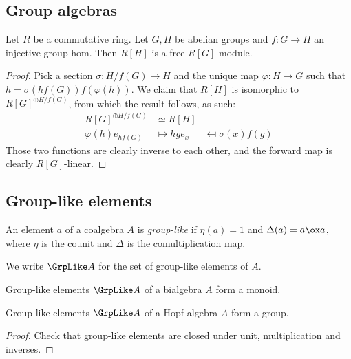 \subsection{Group algebras}


\begin{proposition}
  \label{0-grp-alg-free}
  \uses{}

  Let $R$ be a commutative ring.
  Let $G, H$ be abelian groups and $f : G \to H$ an injective group hom.
  Then $R[H]$ is a free $R[G]$-module.
\end{proposition}
\begin{proof}
  \uses{}

  Pick a section $\sigma : H / f(G) \to H$ and the unique map $\varphi : H \to G$
  such that $h = \sigma(h f(G)) f(\varphi(h))$.
  We claim that $R[H]$ is isomorphic to $R[G]^{\oplus H / f(G)}$, from which the result follows,
  as such:
  \begin{align*}
    R[G]^{\oplus H / f(G)} & \simeq R[H] \\
    \varphi(h) e_{h f(G)} & \mapsto h
    g e_x & \mapsfrom \sigma(x) f(g)
  \end{align*}
  Those two functions are clearly inverse to each other,
  and the forward map is clearly $R[G]$-linear.
\end{proof}

\subsection{Group-like elements}


\begin{definition}
  \label{0-grp-like}
  \uses{}
  \leanok

  An element $a$ of a coalgebra $A$ is \emph{group-like} if $\eta(a) = 1$ and $\Delta(a) = a \ox a$,
  where $\eta$ is the counit and $\Delta$ is the comultiplication map.

  We write $\GrpLike A$ for the set of group-like elements of $A$.
\end{definition}


\begin{proposition}
  \label{0-grp-like-grp}
  \leanok

  Group-like elements $\GrpLike A$ of a bialgebra $A$ form a monoid.

  Group-like elements $\GrpLike A$ of a Hopf algebra $A$ form a group.
\end{proposition}
\begin{proof}
  \uses{}
  \leanok

  Check that group-like elements are closed under unit, multiplication and inverses.
\end{proof}


